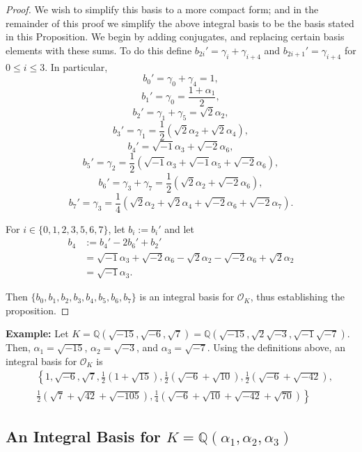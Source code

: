 \documentclass{amsart}
\begin{document}
\begin{proof}
We wish to simplify this basis to a more compact form; and in the remainder of this proof we simplify the above integral basis to be the basis stated in this Proposition. We begin by adding conjugates, and replacing certain basis elements with these sums. To do this define $b_{2i}'=\gamma_i+\gamma_{i+4}$ and $b_{2i+1}'=\gamma_{i+4}$ for $0\leq i\leq 3$.
In particular, 
\[b_0' = \gamma_0 + \gamma_4 =1,\]
\[b_1' = \gamma_0 = \frac{1+\alpha_1}{2},\]
\[b_2' = \gamma_1 + \gamma_5 = \sqrt{2}\alpha_2,\]
\[b_3' = \gamma_1 = \frac{1}{2}\left(\sqrt{2}\alpha_2 + \sqrt{2}\alpha_4\right),\]
\[b_4' = \sqrt{-1} \alpha_3 + \sqrt{-2}\alpha_6,\]
\[b_5' = \gamma_2 = \frac12 \left(\sqrt{-1}\alpha_3 + \sqrt{-1}\alpha_5 + \sqrt{-2}\alpha_6\right),\]
\[b_6'=\gamma_3+\gamma_7 = \frac12\left(\sqrt{2}\alpha_2 + \sqrt{-2}\alpha_6\right),\]
\[b_7' = \gamma_3 =  \frac14\left(\sqrt{2}\alpha_2 + \sqrt{2}\alpha_4 + \sqrt{-2}\alpha_6 + \sqrt{-2}\alpha_7\right).\]


For $i\in\{0,1,2,3,5,6,7\}$, let $b_i:=b_i'$ and let
\begin{align*}
b_4 &:=b_4'-2b_6'+b_2' \\
&= \sqrt{-1} \alpha_3 + \sqrt{-2}\alpha_6 -\sqrt{2}\alpha_2 - \sqrt{-2}\alpha_6 + \sqrt{2}\alpha_2 \\
&= \sqrt{-1} \alpha_3.
\end{align*}
 
Then $\{b_0,b_1,b_2,b_3,b_4,b_5,b_6,b_7\}$ is an integral basis for $\mathcal{O}_K$, thus establishing the proposition.
  
\end{proof}
 
 
 
 \textbf{Example:} Let $K = \mathbb{Q}\left(\sqrt{-15},\sqrt{-6},\sqrt{7}\right) = \mathbb{Q}\left(\sqrt{-15},\sqrt{2}\sqrt{-3},\sqrt{-1}\sqrt{-7}\right)$. Then, $\alpha_1 = \sqrt{-15}$, $\alpha_2 = \sqrt{-3}$, and $\alpha_3 = \sqrt{-7}$. Using the definitions above, an integral basis for $\mathcal{O}_K$ is
 \begin{align*}
      & \left\{ 1, \sqrt{-6}, \sqrt{7},\frac{1}{2}\left(1+\sqrt{15}\right),  \frac{1}{2}\left(\sqrt{-6}+\sqrt{10}\right), \frac{1}{2} \left(\sqrt{-6} + \sqrt{-42} \right),\right. \\
      & \left. \frac{1}{2}\left(\sqrt{7} + \sqrt{42} + \sqrt{-105}\right), \frac{1}{4}\left(\sqrt{-6} + \sqrt{10} + \sqrt{-42} + \sqrt{70}\right)\right\}
\end{align*}
 
 
\newpage\subsection{An Integral Basis for $K=\mathbb{Q}\left(\alpha_1,\alpha_2,\alpha_3\right)$}
\end{document}
